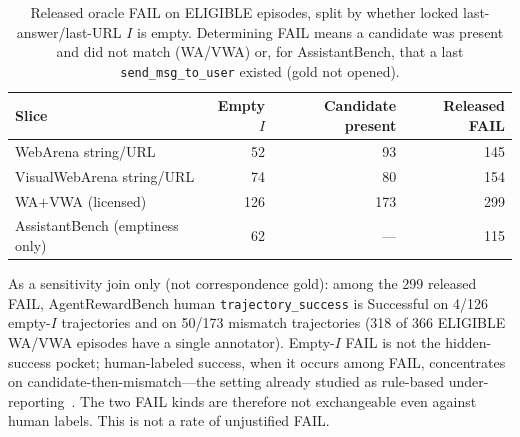 \documentclass[sigconf,anonymous]{aamas}
\begin{document}
\begin{table}[t]
\centering
\caption{Released oracle FAIL on ELIGIBLE episodes, split by whether locked last-answer/last-URL $I$ is empty. Determining FAIL means a candidate was present and did not match (WA/VWA) or, for AssistantBench, that a last \texttt{send\_msg\_to\_user} existed (gold not opened).}
\label{tab:patha-fail}
\small
\begin{tabular}{@{}lrrr@{}}
\toprule
Slice & Empty $I$ & Candidate present & Released FAIL \\
\midrule
WebArena string/URL & 52 & 93 & 145 \\
VisualWebArena string/URL & 74 & 80 & 154 \\
WA$+$VWA (licensed) & 126 & 173 & 299 \\
AssistantBench (emptiness only) & 62 & --- & 115 \\
\bottomrule
\end{tabular}
\end{table}

As a sensitivity join only (not correspondence gold): among the 299 released FAIL, AgentRewardBench human \texttt{trajectory\_success} is Successful on 4/126 empty-$I$ trajectories and on 50/173 mismatch trajectories (318 of 366 ELIGIBLE WA/VWA episodes have a single annotator).
Empty-$I$ FAIL is not the hidden-success pocket; human-labeled success, when it occurs among FAIL, concentrates on candidate-then-mismatch---the setting already studied as rule-based under-reporting~\citep{lu2025agentrewardbench,dong2026misscore}.
The two FAIL kinds are therefore not exchangeable even against human labels.
This is not a rate of unjustified FAIL.




\end{document}
